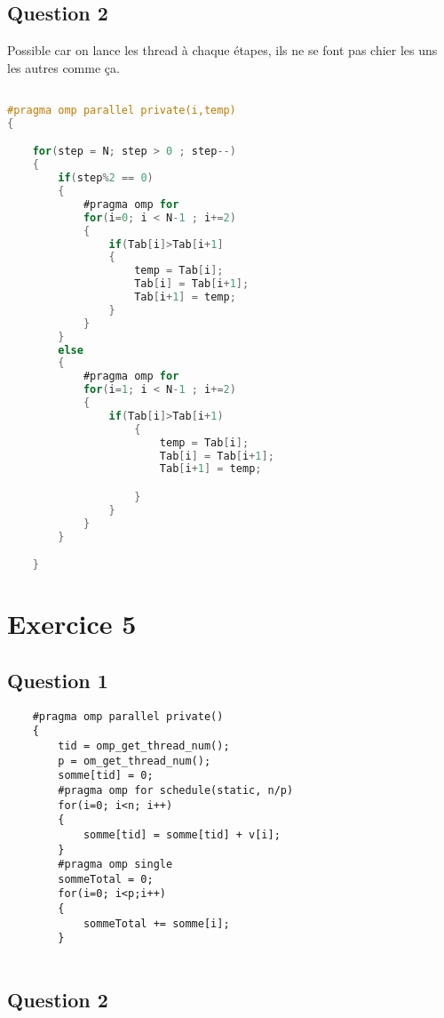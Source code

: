 \documentclass[10pt,a4paper]{article}
\begin{document}
\subsection*{Question 2}
Possible car on lance les thread à chaque étapes, ils ne se font pas chier les uns les autres comme ça.
\begin{lstlisting}[language=C]

#pragma omp parallel private(i,temp)
{

    for(step = N; step > 0 ; step--)
    {
        if(step%2 == 0)
        {
            #pragma omp for
            for(i=0; i < N-1 ; i+=2)
            {
                if(Tab[i]>Tab[i+1]
                {
                    temp = Tab[i];
                    Tab[i] = Tab[i+1];
                    Tab[i+1] = temp;
                }
            }
        }
        else
        {
            #pragma omp for
            for(i=1; i < N-1 ; i+=2)
            {
                if(Tab[i]>Tab[i+1)
                    {
                        temp = Tab[i];
                        Tab[i] = Tab[i+1];
                        Tab[i+1] = temp;

                    }
                }
            }
        }

    }

    \end{lstlisting}

    \section*{Exercice 5}

    \subsection*{Question 1}

    \begin{lstlisting}
    #pragma omp parallel private()
    {
        tid = omp_get_thread_num();
        p = om_get_thread_num();
        somme[tid] = 0;
        #pragma omp for schedule(static, n/p)
        for(i=0; i<n; i++)
        {
            somme[tid] = somme[tid] + v[i];
        }
        #pragma omp single
        sommeTotal = 0;
        for(i=0; i<p;i++)
        {
            sommeTotal += somme[i];	
        }


        \end{lstlisting}

        \subsection*{Question 2}
\end{document}

